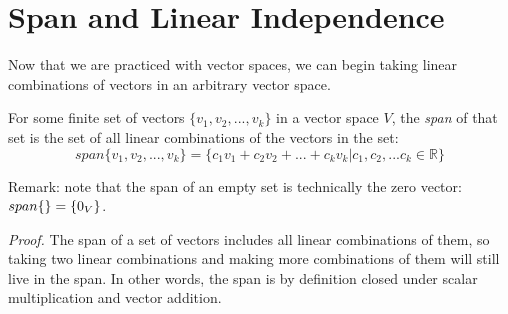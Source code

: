 \chapter{Span and Linear Independence}

Now that we are practiced with vector spaces, we can begin taking linear combinations of vectors in an arbitrary vector space.

 {
    For some finite set of vectors $\{v_1, v_2, ... , v_k\}$ in a vector space $V$, the \textit{span} of that set is the set of 
    all linear combinations of the vectors in the set: \newline 
    \[span\{v_1, v_2, ... , v_k\} = \{c_1v_1 + c_2v_2 + ... + c_kv_k | c_1, c_2, ... c_k \in \mathbb{R}\}\]
}

Remark: note that the span of an empty set is technically the zero vector: $span\{\empty\} = \{0_V\}$.


\textit{Proof.} The span of a set of vectors includes all linear combinations of them, so taking two linear combinations and 
making more combinations of them will still live in the span. In other words, the span is by definition closed under scalar
multiplication and vector addition.


